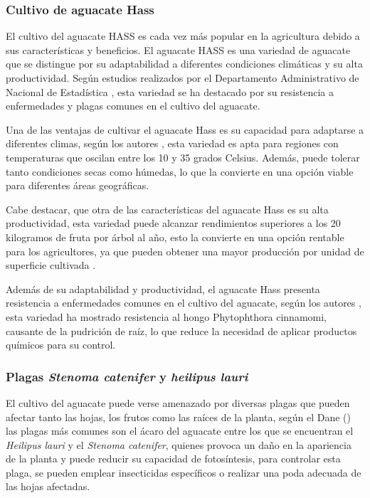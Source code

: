 \newpage


\subsubsection{Cultivo de aguacate Hass}

El cultivo del aguacate HASS es cada vez más popular en la agricultura debido a sus características y beneficios. El aguacate HASS es una variedad de aguacate que se distingue por su adaptabilidad a diferentes condiciones climáticas y su alta productividad. Según estudios realizados por el Departamento Administrativo de Nacional de Estadística \citep{dane2016cultivo}, esta variedad se ha destacado por su resistencia a enfermedades y plagas comunes en el cultivo del aguacate.

Una de las ventajas de cultivar el aguacate Hass es su capacidad para adaptarse a diferentes climas, según los autores \citet{reyes2022}, esta variedad es apta para regiones con temperaturas que oscilan entre los 10 y 35 grados Celsius. Además, puede tolerar tanto condiciones secas como húmedas, lo que la convierte en una opción viable para diferentes áreas geográficas.

Cabe destacar, que  otra de las características  del aguacate Hass es su alta productividad, esta variedad puede alcanzar rendimientos superiores a los 20 kilogramos de fruta por árbol al año, esto la convierte en una opción rentable para los agricultores, ya que pueden obtener una mayor producción por unidad de superficie cultivada \citep{reyes2022}.

Además de su adaptabilidad y productividad, el aguacate Hass presenta resistencia a enfermedades comunes en el cultivo del aguacate, según los autores \citet{agapito2022}, esta variedad ha mostrado resistencia al hongo Phytophthora cinnamomi, causante de la pudrición de raíz, lo que reduce la necesidad de aplicar productos químicos para su control.

\subsubsection{Plagas \textit{Stenoma catenifer} y \textit{heilipus lauri}}

El cultivo del aguacate puede verse amenazado por diversas plagas que pueden afectar tanto las hojas, los frutos como las raíces de la planta, según  el Dane  (\citeyear{dane2016cultivo}) las plagas más comunes son el ácaro del aguacate entre los que se encuentran el \textit{Heilipus lauri} y el \textit{Stenoma catenifer}, quienes provoca un daño en la apariencia de la planta y puede reducir su capacidad de fotosíntesis, para controlar esta plaga, se pueden emplear insecticidas específicos o realizar una poda adecuada de las hojas afectadas.

